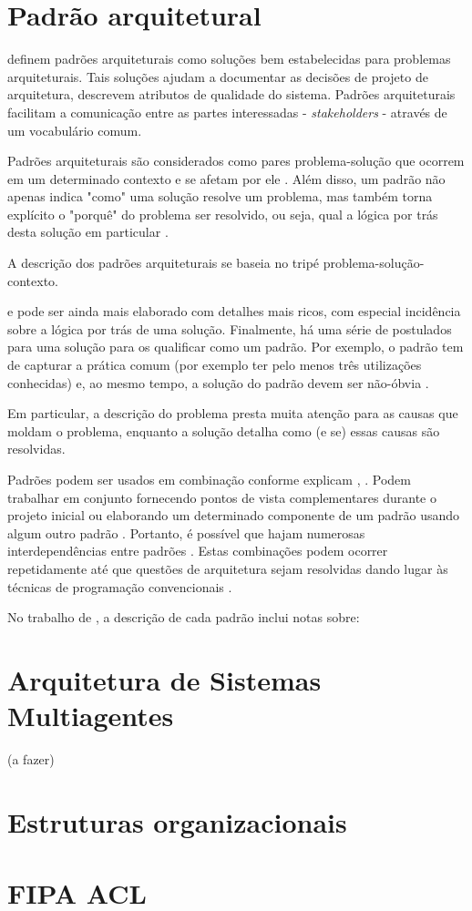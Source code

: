 \section{Padrão arquitetural}


 definem padrões arquiteturais como soluções bem estabelecidas para problemas arquiteturais. Tais soluções ajudam a documentar as decisões de projeto de arquitetura, descrevem atributos de qualidade do sistema. Padrões arquiteturais facilitam a comunicação entre as partes interessadas - \textit{stakeholders} - através de um vocabulário comum.

Padrões arquiteturais são considerados como pares problema-solução que ocorrem em um determinado contexto e se afetam por ele \cite{avgeriou2005}. Além disso, um padrão não apenas indica "como" uma solução resolve um problema, mas também torna explícito o "porquê" do problema ser resolvido, ou seja, qual a lógica por trás desta solução em particular \cite{avgeriou2005}. 

A descrição dos padrões arquiteturais se baseia no tripé problema-solução-contexto.

e pode ser ainda mais elaborado com detalhes mais ricos, com especial incidência sobre a lógica por trás de uma solução. Finalmente, há uma série de postulados para uma solução para os qualificar como um padrão. Por exemplo, o padrão tem de capturar a prática comum (por exemplo ter pelo menos três utilizações conhecidas) e, ao mesmo tempo, a solução do padrão devem ser não-óbvia \cite{avgeriou2005}.

Em particular, a descrição do problema presta muita atenção para as causas que moldam o problema, enquanto a solução detalha como (e se) essas causas são resolvidas. 

Padrões podem ser usados em combinação conforme explicam , . Podem trabalhar em conjunto fornecendo pontos de vista complementares durante o projeto inicial ou elaborando um determinado componente de um padrão usando algum outro padrão \cite{shaw1996}. Portanto, é possível que hajam numerosas interdependências entre padrões \cite{avgeriou2005}. Estas combinações podem ocorrer repetidamente até que questões de arquitetura sejam resolvidas dando lugar às técnicas de programação convencionais \cite{shaw1996}.

No trabalho de , a descrição de cada padrão inclui notas sobre: 



\section{Arquitetura de Sistemas Multiagentes}


(a fazer)

\section{Estruturas organizacionais}

\cite{kolp2006}


\section{FIPA ACL}


